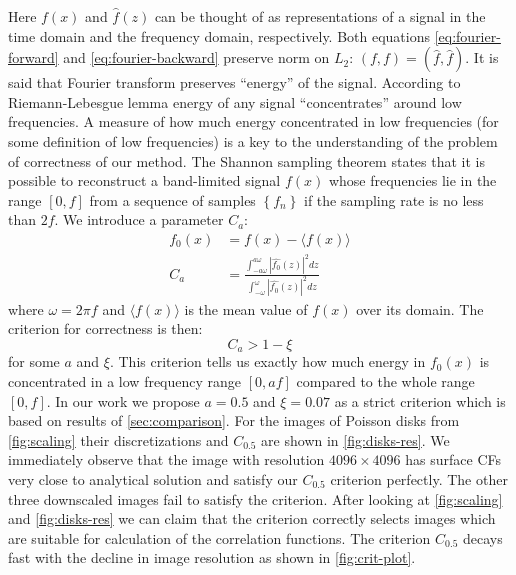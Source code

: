 \documentclass[reprint,amsmath,amssymb,aps,pre,showkeys,showpacs]{revtex4-1}
\begin{document}
Here $f(x)$ and $\hat{f}(z)$ can be thought of as representations of a signal in
the time domain and the frequency domain, respectively. Both equations
\cref{eq:fourier-forward} and \cref{eq:fourier-backward} preserve norm on $L_2$:
$(f, f) = (\hat{f}, \hat{f})$. It is said that Fourier transform preserves
``energy'' of the signal. According to Riemann-Lebesgue lemma \cite{HilbertSpaces}
energy of any signal ``concentrates'' around low frequencies. A measure of how
much energy concentrated in low frequencies (for some definition of low
frequencies) is a key to the understanding of the problem of correctness of our
method. The Shannon sampling theorem \cite{HilbertSpaces} states that it is
possible to reconstruct a band-limited signal $f(x)$ whose frequencies lie in
the range $[0, f]$ from a sequence of samples $\left\{f_n\right\}$ if the
sampling rate is no less than $2f$. We introduce a parameter $C_a$:
\begin{align*}
  f_0(x) &= f(x) - \langle f(x) \rangle \\
  C_a &= \frac{\int_{-a\omega}^{a\omega} |\hat{f_0}(z)|^2 dz}{\int_{-\omega}^{\omega} |\hat{f_0}(z)|^2 dz}
\end{align*}
where $\omega = 2\pi f$ and $\langle f(x) \rangle$ is the mean value of $f(x)$
over its domain. The criterion for correctness is then:
\begin{equation*}
  C_a > 1 - \xi
\end{equation*}
for some $a$ and $\xi$. This criterion tells us exactly how much energy in
$f_0(x)$ is concentrated in a low frequency range $[0, af]$ compared to the
whole range $[0, f]$. In our work we propose $a = 0.5$ and $\xi = 0.07$ as
a strict criterion which is based on results of \cref{sec:comparison}. For the
images of Poisson disks from \cref{fig:scaling} their discretizations and
$C_{0.5}$ are shown in \cref{fig:disks-res}. We immediately observe that the
image with resolution $4096 \times 4096$ has surface CFs very close to
analytical solution and satisfy our  $C_{0.5}$ criterion perfectly. The other
three downscaled images fail to satisfy the criterion. After looking at
\cref{fig:scaling} and \cref{fig:disks-res} we can claim that the criterion
correctly selects images which are suitable for calculation of the correlation
functions. The criterion $C_{0.5}$ decays fast with the decline in image
resolution as shown in \cref{fig:crit-plot}.
\end{document}
